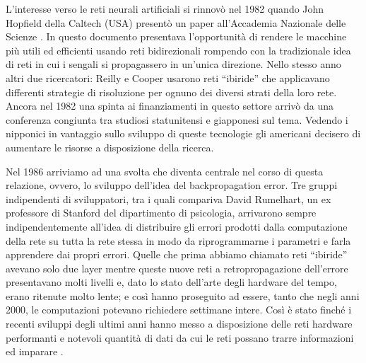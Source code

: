 L'interesse verso le reti neurali artificiali si rinnovò nel 1982 quando  John Hopfield della Caltech (USA) presentò un paper all'Accademia Nazionale delle Scienze \cite{hopfield1982neural}. In questo documento presentava l'opportunità di rendere le macchine più utili ed efficienti usando reti bidirezionali rompendo con la tradizionale idea di reti in cui i sengali si propagassero in un'unica direzione. Nello stesso anno altri due ricercatori: Reilly e Cooper usarono reti ``ibiride'' che applicavano differenti strategie di risoluzione per ognuno dei diversi strati della loro rete\cite{reilly1982neural}. Ancora nel 1982 una spinta ai finanziamenti in questo settore arrivò da una conferenza congiunta tra studiosi statunitensi e giapponesi sul tema. Vedendo i nipponici in vantaggio sullo sviluppo di queste tecnologie gli americani decisero di aumentare le risorse a disposizione della ricerca.

Nel 1986 arriviamo ad una svolta che diventa centrale nel corso di questa relazione, ovvero, lo sviluppo dell'idea del backpropagation error. Tre gruppi indipendenti di sviluppatori, tra i quali compariva David Rumelhart, un ex professore di Stanford del dipartimento di psicologia, arrivarono sempre indipendentemente all'idea  di distribuire gli errori prodotti dalla computazione della rete su tutta la rete stessa in modo da riprogrammarne i parametri e farla apprendere dai propri errori\cite{rumelhart1985learning}.
Quelle che prima abbiamo chiamato reti ``ibiride'' avevano solo due layer mentre queste nuove reti a retropropagazione dell'errore presentavano molti livelli e, dato lo stato dell'arte degli hardware del tempo, erano ritenute molto lente; e così hanno proseguito ad essere, tanto che negli anni 2000, le computazioni potevano richiedere settimane intere. Così è stato finché i recenti sviluppi degli ultimi anni hanno messo a disposizione delle reti hardware performanti e notevoli quantità di dati da cui le reti possano trarre informazioni ed imparare \cite{stanford_history}.

